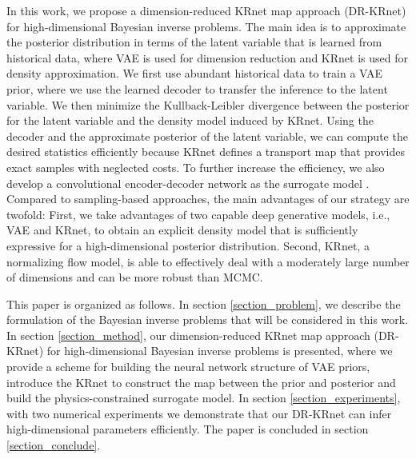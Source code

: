 In this work, we propose a dimension-reduced KRnet map approach (DR-KRnet) for high-dimensional Bayesian inverse problems.
The main idea is to approximate the posterior distribution in terms of the latent variable that is learned from historical data, where VAE is used for dimension reduction and KRnet is used for density approximation. We first use abundant historical data to train a VAE prior, where we use the learned decoder to transfer the inference to the latent variable. We then minimize the Kullback-Leibler divergence between the posterior for the latent variable and the density model induced by KRnet. Using the decoder and the approximate posterior of the latent variable, we can compute the desired statistics efficiently because KRnet defines a transport map that provides exact samples with neglected costs. To further increase the efficiency, we also develop a convolutional encoder-decoder network as the surrogate model \cite{zhu2018bayesian,zhu2019physics}. Compared to sampling-based approaches, the main advantages of our strategy are twofold: First, we take advantages of two capable deep generative models, i.e., VAE and KRnet, to obtain an explicit density model that is sufficiently expressive for a high-dimensional posterior distribution. Second, KRnet, a normalizing flow model, is able to effectively deal with a moderately large number of dimensions and can be more robust than MCMC. 

This paper is organized as follows. In section \ref{section_problem}, we describe the formulation of the Bayesian inverse problems that will be considered in this work. In section \ref{section_method}, our dimension-reduced KRnet map approach (DR-KRnet) for high-dimensional Bayesian inverse problems is presented, where we provide a scheme for building the neural network structure of VAE priors, introduce the KRnet to construct the map between the prior and posterior and build the physics-constrained surrogate model. In section \ref{section_experiments}, with two numerical experiments we demonstrate that our DR-KRnet can infer high-dimensional parameters efficiently. The paper is concluded in section \ref{section_conclude}.